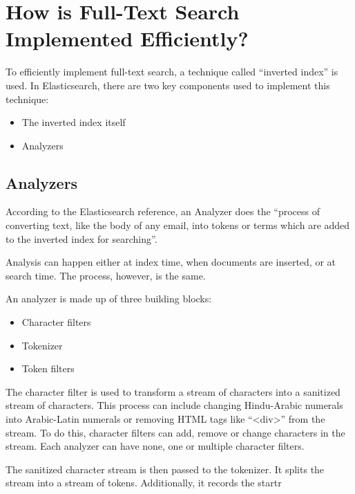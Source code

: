 \chapter{How is Full-Text Search Implemented Efficiently?}
To efficiently implement full-text search, a technique called “inverted index” is used. In Elasticsearch, there are two key components used to implement this technique:
\begin{itemize}
    \item The inverted index itself
    \item Analyzers
\end{itemize}

\section{Analyzers}
According to the Elasticsearch reference, an Analyzer does the “process of converting text, like the body of any email, into tokens or terms which are added to the inverted index for searching”.

Analysis can happen either at index time, when documents are inserted, or at search time. The process, however, is the same.

An analyzer is made up of three building blocks:
\begin{itemize}
    \item Character filters
    \item Tokenizer
    \item Token filters
\end{itemize}

The character filter is used to transform a stream of characters into a sanitized stream of characters. This process can include changing Hindu-Arabic numerals into Arabic-Latin numerals or removing HTML tags like “<div>” from the stream. To do this, character filters can add, remove or change characters in the stream. Each analyzer can have none, one or multiple character filters.

The sanitized character stream is then passed to the tokenizer. It splits the stream into a stream of tokens. Additionally, it records the startr
